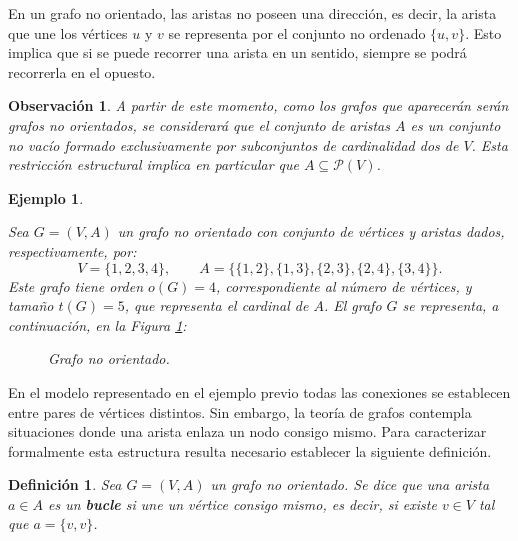\documentclass[11pt,a4paper,spanish]{report}
\theoremstyle{plain}
\newtheorem{definicion}{Definición}[chapter]
\newtheorem{nota}{Observación}
\newtheorem{ejemplo}{Ejemplo}[chapter]
\begin{document}
En un grafo no orientado, las aristas no poseen una dirección, es decir, la arista que une los vértices $u$ y $v$ se representa por el conjunto no ordenado $\{u,v\}$. 
Esto implica que si se puede recorrer una arista en un sentido, siempre se podrá recorrerla en el opuesto. 
\begin{nota}
A partir de este momento, como los grafos que aparecerán serán grafos no orientados, se considerará que el conjunto de aristas $A$ es un conjunto no vacío formado exclusivamente por subconjuntos de cardinalidad dos de $V$. Esta restricción estructural implica en particular que $A \subseteq \mathcal{P}(V)$.
\end{nota}

\begin{ejemplo}\label{G}
    

Sea $G = (V, A)$ un grafo no orientado con conjunto de vértices y aristas dados, respectivamente, por:
\[
V = \{1, 2, 3, 4\}, \qquad
A = \{\{1,2\}, \{1,3\}, \{2,3\}, \{2,4\}, \{3,4\}\}.
\]
Este grafo tiene orden $o(G) = 4$, correspondiente al número de vértices, y tamaño $t(G) = 5$, que representa el cardinal de $A$. El grafo $G$ se representa, a continuación, en la Figura \ref{fig:grafo no orientado}:
 \begin{figure}[H]
\begin{center}
\centering
{}
\end{center}
     \caption{{Grafo no orientado.}}
     \label{fig:enter-label}
      \label{fig:grafo no orientado}
 \end{figure}
\end{ejemplo}


En el modelo representado en el ejemplo previo todas las conexiones se establecen entre pares de vértices distintos. Sin embargo, la teoría de grafos contempla situaciones donde una arista enlaza un nodo consigo mismo. Para caracterizar formalmente esta estructura resulta necesario establecer la siguiente definición.
\begin{definicion}
Sea $G=(V,A)$ un grafo no orientado.  
Se dice que una arista $a \in A$ es un \textbf{bucle} si une un vértice consigo mismo, es decir, si existe $v \in V$ tal que $a = \{v,v\}$.
\end{definicion}
\end{document}
